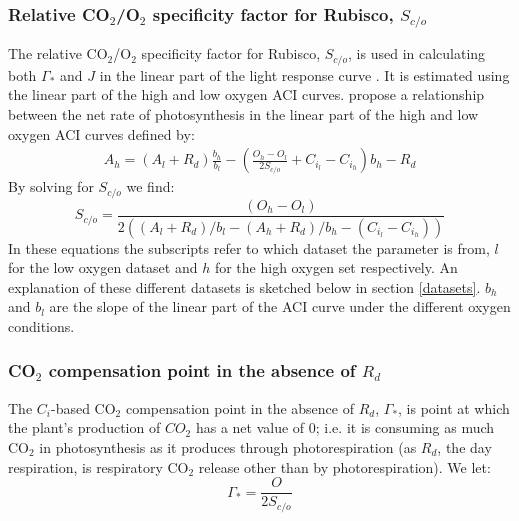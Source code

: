 \documentclass[11pt]{article} %
\begin{document}
\subsubsection{Relative CO$_2$/O$_2$ specificity factor for Rubisco, $S_{c/o}$}
The relative CO$_2$/O$_2$ specificity factor for Rubisco, $S_{c/o}$, is used in calculating both $\Gamma_*$ and $J$ in the linear part of the light response curve \cite{YinUsingcombinedmeasurements2009}. It is estimated using the linear part of the high and low oxygen ACI curves. \citet{YinUsingcombinedmeasurements2009} propose a relationship between the net rate of photosynthesis in the linear part of the high and low oxygen ACI curves defined by:
\begin{align}
A_h = (A_l + R_d) \frac{b_h}{b_l} - \left( \frac{O_h - O_l}{2 S_{c/o}} + C_{i_l} - C_{i_h} \right) b_h - R_d
\end{align}
By solving for $S_{c/o}$ we find:
\begin{equation} \label{Sco_eqn}
S_{c/o} = \frac{(O_h - O_l)}{2 ((A_l + R_d) / b_l - (A_h + R_d) / b_h - (C_{i_l} - C_{i_h}))}
\end{equation}
In these equations the subscripts refer to which dataset the parameter is from, $l$ for the low oxygen dataset and $h$ for the high oxygen set respectively. An explanation of these different datasets is sketched below in section \ref{datasets}. $b_h$ and $b_l$ are the slope of the linear part of the ACI curve under the different oxygen conditions.

\subsubsection{CO$_2$ compensation point in the absence of $R_d$}
The $C_i$-based CO$_2$ compensation point in the absence of $R_d$, $\Gamma_*$, is point at which the plant's production of $CO_2$ has a net value of $0$; i.e. it is consuming as much CO$_2$ in photosynthesis as it produces through photorespiration (as $R_d$, the day respiration, is respiratory CO$_2$ release other than by photorespiration). We let:
\begin{equation} \label{Gstar_eqn}
\Gamma_* = \frac{O}{2S_{c/o}}
\end{equation}
\end{document}
